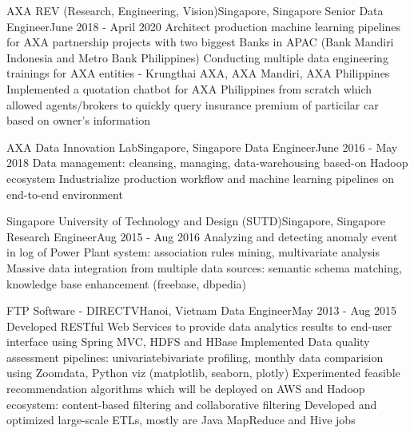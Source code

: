     \resumeSubheading
      {AXA REV (Research, Engineering, Vision)}{Singapore, Singapore}
      {Senior Data Engineer}{June 2018 - April 2020}
      \resumeItemListStart
          {Architect production machine learning pipelines for AXA partnership projects with two biggest Banks in APAC (Bank Mandiri Indonesia and Metro Bank Philippines)}
          {Conducting multiple data engineering trainings for AXA entities - Krungthai AXA, AXA Mandiri, AXA Philippines}
          {Implemented a quotation chatbot for AXA Philippines from scratch which allowed agents/brokers to quickly query insurance premium of particilar car based on owner's information}
      \resumeItemListEnd

    \resumeSubheading
      {AXA Data Innovation Lab}{Singapore, Singapore}
      {Data Engineer}{June 2016 - May 2018}
      \resumeItemListStart
          {Data management: cleansing, managing, data-warehousing based-on Hadoop ecosystem}
          {Industrialize production workflow and machine learning pipelines on end-to-end environment}
      \resumeItemListEnd
    
    \resumeSubheading
      {Singapore University of Technology and Design (SUTD)}{Singapore, Singapore}
      {Research Engineer}{Aug 2015 - Aug 2016}
      \resumeItemListStart
          {Analyzing and detecting anomaly event in log of Power Plant system: association rules mining, multivariate analysis}
          {Massive data integration from multiple data sources: semantic schema matching, knowledge base enhancement (freebase, dbpedia)}
      \resumeItemListEnd

    \resumeSubheading
      {FTP Software - DIRECTV}{Hanoi, Vietnam}
      {Data Engineer}{May 2013 - Aug 2015}
      \resumeItemListStart
          {Developed RESTful Web Services to provide data analytics results to end-user interface using Spring MVC, HDFS and HBase}
          {Implemented Data quality assessment pipelines: univariate\/bivariate profiling, monthly data comparision using Zoomdata, Python viz (matplotlib, seaborn, plotly)}
          {Experimented feasible recommendation algorithms which will be deployed on AWS and Hadoop ecosystem: content-based filtering and collaborative filtering}
          {Developed and optimized large-scale ETLs, mostly are Java MapReduce and Hive jobs}
      \resumeItemListEnd

